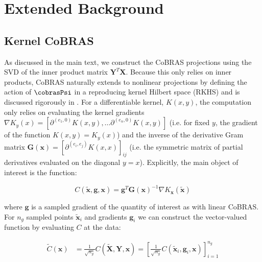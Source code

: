 \documentclass[twocolumn,10pt]{article}
\begin{document}
\renewcommand{\theHsection}{SI.\arabic{section}}
\renewcommand{\theHsubsection}{SI.\arabic{section}.\arabic{subsection}}
\renewcommand{\theHfigure}{SI.\arabic{figure}}
\renewcommand{\theHequation}{SI.\arabic{equation}}
\renewcommand{\theHtable}{SI.\arabic{table}}

\section{Extended Background}
\label{si:background}


\subsection{Kernel CoBRAS}
\label{si:cobras_kernel}
As discussed in the main text, we construct the CoBRAS projections using the SVD of the inner product matrix $\mathbf Y^T \mathbf X$. Because this only relies on inner products, CoBRAS naturally extends to nonlinear projections by defining the action of $\cobrasPsi$ in a reproducing kernel Hilbert space (RKHS) and is discussed rigorously in \cite{otto2023model}. For a differentiable kernel, $K(x,y)$, the computation only relies on evaluating the kernel gradients $\nabla K_y(x) = [\partial^{(e_1,0)}K(x,y), \dots \partial^{(e_n,0)}K(x,y)]$ (i.e. for fixed $y$, the gradient of the function $K(x,y) = K_y(x)$) and the inverse of the derivative Gram matrix $\mathbf G(\mathbf x) = [\partial^{(e_i, e_j)}K(x,x)]_{ij}$ (i.e. the symmetric matrix of partial derivatives evaluated on the diagonal $y=x$). Explicitly, the main object of interest is the function: 

\begin{equation}
    C(\mathbf {\tilde {x}},\mathbf g, \mathbf x) 
    = 
    \mathbf{g}^T \mathbf{G}(\mathbf x)^{-1}\nabla K_\mathbf x(\mathbf{\tilde{x}})
\end{equation}

\noindent where $\mathbf g$ is a sampled gradient of the quantity of interest as with linear CoBRAS. For $n_g$ sampled points $\mathbf {\tilde x}_i$ and gradients $\mathbf g_i$ we can construct the vector-valued function by evaluating $C$ at the data:

\begin{align}
        \tilde C(\mathbf x) 
    &= \frac{1}{\sqrt{n_g}} C(\mathbf{\tilde X}, \mathbf Y, \mathbf{x}) 
        = \left[\frac{1}{\sqrt{n_g}}C(\mathbf{\tilde x}_i, \mathbf{g}_i, \mathbf{x})
        \right]_{i=1}^{n_g}
\end{align}
\end{document}
